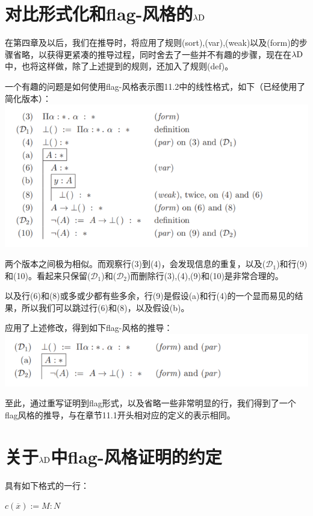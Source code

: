 \documentclass[UTF8]{article}
\begin{document}
	\section{对比形式化和flag-风格的$\lambda{\rm D}$}
	\noindent
	在第四章及以后，我们在推导时，将应用了规则(sort),(var),(weak)以及(form)的步骤省略，以获得更紧凑的推导过程，同时舍去了一些并不有趣的步骤，现在在$\lambda{\rm D}$中，也将这样做，除了上述提到的规则，还加入了规则(def)。
	
		一个有趣的问题是如何使用flag-风格表示图11.2中的线性格式，如下（已经使用了简化版本）：\\
		\includegraphics[width=0.93\linewidth]{"../imgs/11-2.png"}
		
		两个版本之间极为相似。而观察行(3)到(4)，会发现信息的重复，以及($\mathcal{D}_1$)和行(9)和(10)。看起来只保留($\mathcal{D}_1$)和($\mathcal{D}_2$)而删除行(3),(4),(9)和(10)是非常合理的。
		
		以及行(6)和(8)或多或少都有些多余，行(9)是假设(a)和行(4)的一个显而易见的结果，所以我们可以跳过行(6)和(8)，以及假设(b)。
		
		应用了上述修改，得到如下flag-风格的推导：\\
		\includegraphics[width=0.93\linewidth]{"../imgs/11-3.png"}
		
		至此，通过重写证明到flag形式，以及省略一些非常明显的行，我们得到了一个flag风格的推导，与在章节11.1开头相对应的定义的表示相同。
		
	\section{关于$\lambda{\rm D}$中flag-风格证明的约定}
	\noindent
	具有如下格式的一行：
	
		$c(\overline{x}):=M:N$
	
\end{document}
